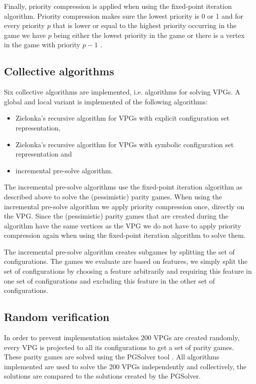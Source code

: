 Finally, priority compression is applied when using the fixed-point iteration algorithm. Priority compression makes sure the lowest priority is 0 or 1 and for every priority $p$ that is lower or equal to the highest priority occurring in the game we have $p$ being either the lowest priority in the game or there is a vertex in the game with priority $p-1$ \cite{FPITE,friedmanPG}.

\subsection{Collective algorithms}
Six collective algorithms are implemented, i.e. algorithms for solving VPGs. A global and local variant is implemented of the following algorithms:
\begin{itemize}
	\item Zielonka's recursive algorithm for VPGs with explicit configuration set representation,
	\item Zielonka's recursive algorithm for VPGs with symbolic configuration set representation and
	\item incremental pre-solve algorithm.
\end{itemize}
The incremental pre-solve algorithms use the fixed-point iteration algorithm as described above to solve the (pessimistic) parity games. When using the incremental pre-solve algorithm we apply priority compression once, directly on the VPG. Since the (pessimistic) parity games that are created during the algorithm have the same vertices as the VPG we do not have to apply priority compression again when using the fixed-point iteration algorithm to solve them.

The incremental pre-solve algorithm creates subgames by splitting the set of configurations. The games we evaluate are based on features, we simply split the set of configurations by choosing a feature arbitrarily and requiring this feature in one set of configurations and excluding this feature in the other set of configurations.
\subsection{Random verification}
In order to prevent implementation mistakes 200 VPGs are created randomly, every VPG is projected to all its configurations to get a set of parity games. These parity games are solved using the PGSolver tool \cite{Friedmann2010ThePC}. All algorithms implemented are used to solve the 200 VPGs independently and collectively, the solutions are compared to the solutions created by the PGSolver.